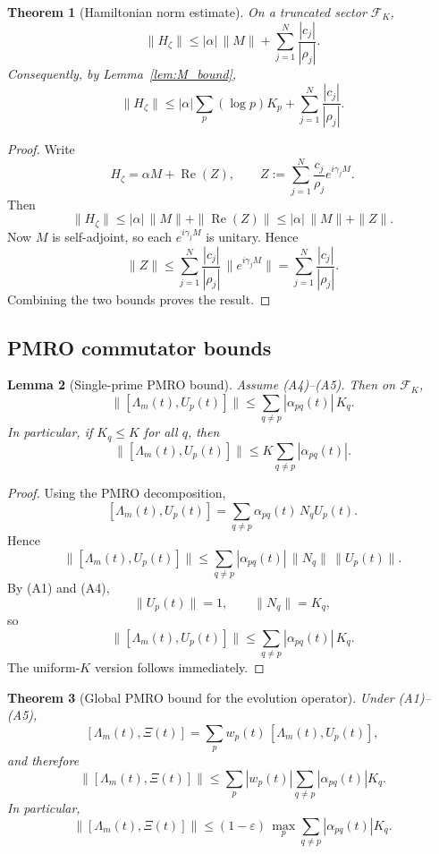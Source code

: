 \documentclass[12pt]{amsart}
\theoremstyle{plain}
\newtheorem{theorem}{Theorem}[section]
\newtheorem{lemma}[theorem]{Lemma}
\begin{document}
\begin{theorem}[Hamiltonian norm estimate]
\label{thm:Hzeta_bound}
On a truncated sector \(\mathcal F_K\),
\[
\|H_\zeta\|
\le
|\alpha|\,\|M\|
+
\sum_{j=1}^N \frac{|c_j|}{|\rho_j|}.
\]
Consequently, by Lemma~\ref{lem:M_bound},
\[
\|H_\zeta\|
\le
|\alpha|
\sum_p (\log p)K_p
+
\sum_{j=1}^N \frac{|c_j|}{|\rho_j|}.
\]
\end{theorem}

\begin{proof}
Write
\[
H_\zeta
=
\alpha M + \operatorname{Re}(Z),
\qquad
Z:=\sum_{j=1}^N \frac{c_j}{\rho_j} e^{i\gamma_j M}.
\]
Then
\[
\|H_\zeta\|
\le
|\alpha|\,\|M\| + \|\operatorname{Re}(Z)\|
\le
|\alpha|\,\|M\| + \|Z\|.
\]
Now \(M\) is self-adjoint, so each \(e^{i\gamma_j M}\) is unitary. Hence
\[
\|Z\|
\le
\sum_{j=1}^N \frac{|c_j|}{|\rho_j|}\,\|e^{i\gamma_j M}\|
=
\sum_{j=1}^N \frac{|c_j|}{|\rho_j|}.
\]
Combining the two bounds proves the result.
\end{proof}

\subsection{PMRO commutator bounds}

\begin{lemma}[Single-prime PMRO bound]
\label{lem:pmro_single}
Assume \textup{(A4)}--\textup{(A5)}. Then on \(\mathcal F_K\),
\[
\|[\Lambda_m(t),U_p(t)]\|
\le
\sum_{q\ne p} |\alpha_{pq}(t)|\,K_q.
\]
In particular, if \(K_q\le K\) for all \(q\), then
\[
\|[\Lambda_m(t),U_p(t)]\|
\le
K\sum_{q\ne p} |\alpha_{pq}(t)|.
\]
\end{lemma}

\begin{proof}
Using the PMRO decomposition,
\[
[\Lambda_m(t),U_p(t)]
=
\sum_{q\ne p}\alpha_{pq}(t)\,N_qU_p(t).
\]
Hence
\[
\|[\Lambda_m(t),U_p(t)]\|
\le
\sum_{q\ne p} |\alpha_{pq}(t)|\,\|N_q\|\,\|U_p(t)\|.
\]
By \textup{(A1)} and \textup{(A4)},
\[
\|U_p(t)\|=1,
\qquad
\|N_q\|=K_q,
\]
so
\[
\|[\Lambda_m(t),U_p(t)]\|
\le
\sum_{q\ne p} |\alpha_{pq}(t)|\,K_q.
\]
The uniform-\(K\) version follows immediately.
\end{proof}

\begin{theorem}[Global PMRO bound for the evolution operator]
\label{thm:pmro_global}
Under \textup{(A1)}--\textup{(A5)},
\[
[\Lambda_m(t),\Xi(t)]
=
\sum_{p} w_p(t)\,[\Lambda_m(t),U_p(t)],
\]
and therefore
\[
\|[\Lambda_m(t),\Xi(t)]\|
\le
\sum_p |w_p(t)| \sum_{q\ne p} |\alpha_{pq}(t)|K_q.
\]
In particular,
\[
\|[\Lambda_m(t),\Xi(t)]\|
\le
(1-\varepsilon)\,
\max_{p}
\sum_{q\ne p} |\alpha_{pq}(t)|K_q.
\]
\end{theorem}
\end{document}
